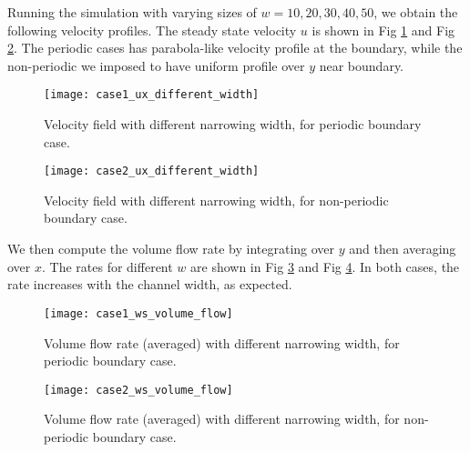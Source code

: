 \graphicspath{ {./JiaweiZhuang/HW2_figures/different_width/} }

\begin{solution} 

Running the simulation with varying sizes of $w=10, 20, 30, 40, 50$, we obtain the following velocity profiles. The steady state velocity $u$ is shown in Fig \ref{fig:ux_ws_case1} and Fig \ref{fig:ux_ws_case2}. The periodic cases has parabola-like velocity profile at the boundary, while the non-periodic we imposed to have uniform profile over $y$ near boundary.

\begin{figure}[H]
\texttt{[image: case1\_ux\_different\_width]}
\centering
\caption{Velocity field with different narrowing width, for periodic boundary case.}
\label{fig:ux_ws_case1}
\end{figure}

\end{solution}

\begin{solution} 

\begin{figure}[H]
\texttt{[image: case2\_ux\_different\_width]}
\centering
\caption{Velocity field with different narrowing width, for non-periodic boundary case.}
\label{fig:ux_ws_case2}
\end{figure}

\end{solution}


\begin{solution} 

We then compute the volume flow rate by integrating over $y$ and then averaging over $x$. The rates for different $w$ are shown in Fig \ref{fig:flow_ws_case1} and Fig \ref{fig:flow_ws_case2}. In both cases, the rate increases with the channel width, as expected.

\begin{figure}[H]
\texttt{[image: case1\_ws\_volume\_flow]}
\centering
\caption{Volume flow rate (averaged) with different narrowing width, for periodic boundary case.}
\label{fig:flow_ws_case1}
\end{figure}

\begin{figure}[H]
\texttt{[image: case2\_ws\_volume\_flow]}
\centering
\caption{Volume flow rate (averaged) with different narrowing width, for non-periodic boundary case.}
\label{fig:flow_ws_case2}
\end{figure}

\end{solution}